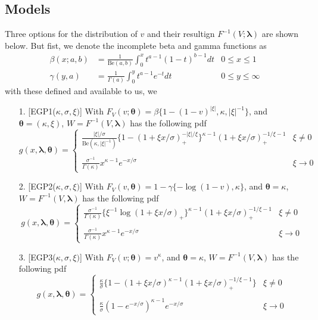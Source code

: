 \documentclass{article}
\theoremstyle{definition}
\theoremstyle{definition}
\def\lam{\boldsymbol{\lambda}}
\def\thet{\boldsymbol{\theta}}
\def\k{\kappa}
\begin{document}
\subsection{Models}
Three options for the distribution of $v$ and their resultign $F^{-1}(V;\lam)$ are shown below. But fist, we denote the incomplete beta and gamma functions as 
\begin{align*}
    \beta(x;a,b)&=\frac{1}{\text{Be}(a,b)} \int_{0}^x t^{a-1}(1-t)^{b-1}dt & 0\leq x\leq 1\\
    \gamma(y,a)&=\frac{1}{\Gamma(a)}\int_{0}^yt^{a-1}e^{-t}dt & 0\leq y\leq \infty
\end{align*}
with these defined and available to us, we 
\begin{enumerate}
    \item  [1.] [EGP1($\k, \sigma,\xi)$] With $F_V(v;\thet)=\beta\{1-(1-v)^{|\xi|},\k,|\xi|^{-1}\}$, and $\thet =(\kappa,\xi)$, $W=F^{-1}(V,\lam)$ has the following pdf
    \[g(x,\lam,\thet)=\begin{cases} \frac{|\xi|/\sigma}{\text{Be}(\k, |\xi|^{-1})}\{1-(1+\xi x/\sigma)_+^{-|\xi|/\xi}\}^{\k-1} (1+\xi x/\sigma)_+^{-1/\xi-1} & \xi \neq 0\\\\
    \frac{\sigma^{-1}}{\Gamma(\k)}x^{\k-1}e^{-x/\sigma} & \xi \rightarrow 0
    \end{cases}\]
    
    \item [2.][EGP2($\k, \sigma,\xi)$] With $F_V(v,\thet)=1-\gamma\{-\log(1-v),\k\}$, and $\thet= \k$,  $W=F^{-1}(V,\lam)$ has the following pdf
    \[g(x,\lam,\thet)= \begin{cases}\frac{\sigma^{-1}}{\Gamma(\k)}\{\xi^{-1}\log(1+\xi x/\sigma)_+\}^{\k-1} (1+\xi x/\sigma)_+^{-1/\xi-1} & \xi\neq 0\\\\
    \frac{\sigma^{-1}}{\Gamma(\k)}x^{\k-1}e^{-x/\sigma} & \xi\rightarrow 0
    \end{cases}\]
    \item [3.] [EGP3($\k, \sigma,\xi)$] With $F_V(v;\thet)= v^\k$, and $\thet= \k$, $W=F^{-1}(V,\lam)$ has the following pdf
    \[g(x,\lam,\thet)= \begin{cases} \frac{\k}{\sigma}\{1-(1+\xi x/\sigma)^{\k-1}(1+\xi x/\sigma)_+^{-1/\xi-1}\} & \xi \neq 0\\\\
    \frac{\k}{\sigma}(1-e^{-x/\sigma})^{\k-1}e^{-x/\sigma} & \xi \rightarrow 0
    \end{cases}\]
\end{enumerate}
\end{document}
